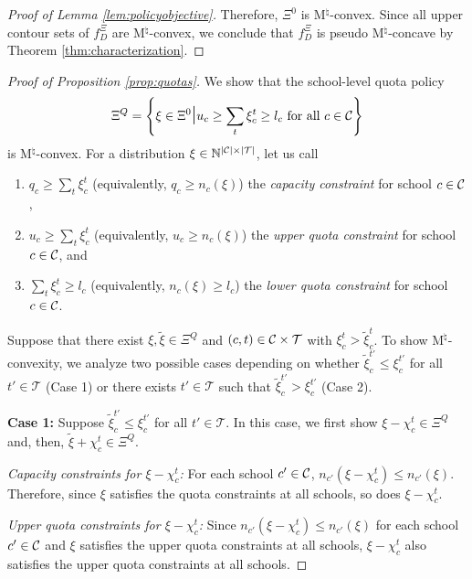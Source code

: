 \documentclass[12pt]{amsart}
\theoremstyle{remark}
\def\T{\mathcal{T}} \def\calt{\mathcal{T}}
\begin{document}
\begin{proof}[Proof of Lemma \ref{lem:policyobjective}]
Therefore, $\Xi^0$ is M$^{\natural}$-convex. Since all upper contour sets of $f^{\Xi}_D$ are M$^{\natural}$-convex,
we conclude that $f^{\Xi}_D$ is pseudo M$^{\natural}$-concave by Theorem \ref{thm:characterization}.
\end{proof}

\medskip



\begin{proof}[Proof of Proposition \ref{prop:quotas}]
We show that the school-level quota policy
\[\Xi^Q = \left \{\xi \in \Xi^0 \mathlarger{\mathlarger{\mid}}  u_c \geq \sum_{t} \xi_c^t \geq l_c \text{ for all } c\in \calc \right \}\]
is M$^{\natural}$-convex.
For a distribution $\xi \in \mathbb N^{|\C|\times |\T|}$, let us call
\begin{enumerate}
\item $q_c \geq \sum_t \xi_c^t$ (equivalently, $q_c \geq n_c(\xi)$) the \emph{capacity constraint} for school $c\in \mathcal{C}$,
\item $u_c \geq \sum_{t} \xi_c^t$ (equivalently, $u_c \geq n_c(\xi)$) the \emph{upper quota constraint} for school $c \in \mathcal{C}$, and
\item $\sum_{t} \xi_c^t \geq l_c$ (equivalently, $n_c(\xi) \geq l_c$) the \emph{lower quota constraint} for school $c\in \mathcal{C}$.
\end{enumerate}


Suppose that there exist $\xi,\tilde{\xi}\in \Xi^Q$ and $(c,t)\in \calc \times \calt$ with $\xi_c^t>\tilde{\xi}_{c}^{t}$. To show M$^{\natural}$-convexity,
we analyze two possible cases depending on whether $\tilde{\xi}_{c}^{t'} \le \xi_{c}^{t'}$ for all $t' \in \calt$ (Case 1) or there exists
$t' \in \calt$ such that $\tilde{\xi}_{c}^{t'} > \xi_{c}^{t'}$ (Case 2).

\medskip
\textbf{Case 1:}  Suppose $\tilde{\xi}_{c}^{t'} \le \xi_{c}^{t'}$ for all $t' \in \calt$. In this case, we first show
$\xi-\chi_c^t \in \Xi^Q$ and, then, $\tilde{\xi}+\chi_c^t \in \Xi^Q$.

\smallskip
\noindent \emph{Capacity constraints for $\xi-\chi_c^t$:} For each school $c'\in \mathcal{C}$, $n_{c'}(\xi-\chi_c^t) \leq n_{c'}(\xi)$. Therefore,
since $\xi$ satisfies the quota constraints at all schools, so does $\xi-\chi_c^t$.

\smallskip
\noindent \emph{Upper quota constraints for $\xi-\chi_c^t$:} Since $n_{c'}(\xi-\chi_c^t) \leq n_{c'}(\xi)$ for each school $c'\in \mathcal{C}$ and
$\xi$ satisfies the upper quota constraints at all schools, $\xi-\chi_c^t$ also satisfies the upper quota constraints at all schools.


\end{proof}
\end{document}
